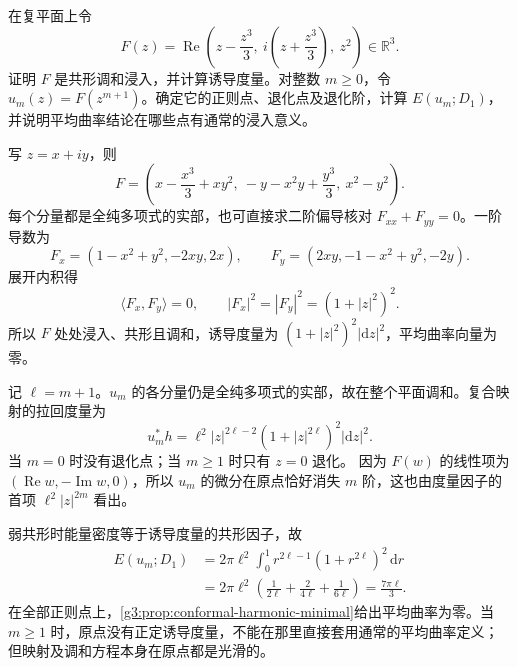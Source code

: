 \begin{exercise}\label{g3:ex:enneper-branched-parametrization}
	在复平面上令
	\[
		F(z)=\operatorname{Re}
		\left(z-\frac{z^3}{3},\
		i\left(z+\frac{z^3}{3}\right),\
		z^2\right)\in\mathbb R^3.
	\]
	证明 \(F\) 是共形调和浸入，并计算诱导度量。对整数 \(m\ge0\)，令
	\(u_m(z)=F(z^{m+1})\)。确定它的正则点、退化点及退化阶，计算
	\(E(u_m;D_1)\)，并说明平均曲率结论在哪些点有通常的浸入意义。
\end{exercise}
\begin{solution}
	写 \(z=x+iy\)，则
	\[
		F=\left(x-\frac{x^3}{3}+xy^2,\
		-y-x^2y+\frac{y^3}{3},\
		x^2-y^2\right).
	\]
	每个分量都是全纯多项式的实部，也可直接求二阶偏导核对
	\(F_{xx}+F_{yy}=0\)。一阶导数为
	\[
		F_x=(1-x^2+y^2,-2xy,2x),\qquad
		F_y=(2xy,-1-x^2+y^2,-2y).
	\]
	展开内积得
	\[
		\langle F_x,F_y\rangle=0,\qquad
		|F_x|^2=|F_y|^2=(1+|z|^2)^2.
	\]
	所以 \(F\) 处处浸入、共形且调和，诱导度量为
	\((1+|z|^2)^2|\mathrm dz|^2\)，平均曲率向量为零。

	记 \(\ell=m+1\)。\(u_m\) 的各分量仍是全纯多项式的实部，故在整个平面调和。复合映射的拉回度量为
	\[
		u_m^*h
		=\ell^2|z|^{2\ell-2}(1+|z|^{2\ell})^2|\mathrm dz|^2.
	\]
	当 \(m=0\) 时没有退化点；当 \(m\ge1\) 时只有 \(z=0\) 退化。
	因为 \(F(w)\) 的线性项为
	\((\operatorname{Re}w,-\operatorname{Im}w,0)\)，所以 \(u_m\) 的微分在原点恰好消失 \(m\) 阶，这也由度量因子的首项
	\(\ell^2|z|^{2m}\) 看出。

	弱共形时能量密度等于诱导度量的共形因子，故
	\[
		\begin{aligned}
		E(u_m;D_1)
		&=2\pi\ell^2\int_0^1
		r^{2\ell-1}(1+r^{2\ell})^2\,\mathrm dr\\
		&=2\pi\ell^2
		\left(\frac1{2\ell}+\frac2{4\ell}+\frac1{6\ell}\right)
		=\frac{7\pi\ell}{3}.
		\end{aligned}
	\]
	在全部正则点上，\cref{g3:prop:conformal-harmonic-minimal}给出平均曲率为零。当 \(m\ge1\) 时，原点没有正定诱导度量，不能在那里直接套用通常的平均曲率定义；但映射及调和方程本身在原点都是光滑的。
\end{solution}

